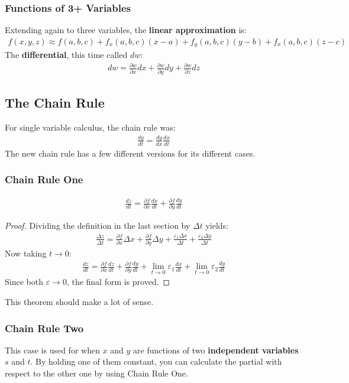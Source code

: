 \documentclass{article}
\newcommand{\p}{\partial}
\begin{document}
\subsubsection{Functions of 3+ Variables}
Extending again to three variables, the \textbf{linear approximation} is:
\begin{gather*}
    f(x,y,z) \approx f(a,b,c) + f_x(a,b,c)(x-a) + f_y(a,b,c)(y-b) + f_x(a,b,c)(z-c)
\end{gather*}
The \textbf{differential}, this time called $dw$:
\begin{gather*}
    dw = \frac{\p w}{\p x}dx + \frac{\p w}{\p y}dy + \frac{\p w}{\p z}dz
\end{gather*}
\subsection{The Chain Rule}
For single variable calculus, the chain rule was:
\begin{gather*}
    \frac{dy}{dt} = \frac{dy}{dx}\frac{dx}{dt}
\end{gather*}
The new chain rule has a few different versions for its different cases.
\subsubsection{Chain Rule One}
\begin{gather*}
    \frac{dz}{dt} = \frac{\p f}{\p x}\frac{dx}{dt} + \frac{\p f}{\p y}\frac{dy}{dt}
\end{gather*}
\begin{proof}
Dividing the definition in the last section by $\Delta t$ yields:
\begin{gather*}
    \frac{\Delta z}{\Delta t} = \frac{\p f}{\p x}\Delta x + \frac{\p f}{\p y} \Delta y + \frac{\varepsilon_1 \Delta x}{\Delta t} + \frac{\varepsilon_2 \Delta y}{\Delta t}
\end{gather*}
Now taking $t \to 0$:
\begin{gather*}
    \frac{dz}{dt} = \frac{\p f}{\p x}\frac{dz}{dt} + \frac{\p f}{\p y} \frac{dy}{dt} + \lim_{t \to 0} \varepsilon_1 \frac{dx}{dt} + \lim_{t \to 0} \varepsilon_2 \frac{dy}{dt}
\end{gather*}
Since both $\varepsilon \to 0$, the final form is proved.
\end{proof}
This theorem should make a lot of sense.
\subsubsection{Chain Rule Two}
This case is used for when $x$ and $y$ are functions of two \textbf{independent variables} $s$ and $t$. By holding one of them constant, you can calculate the partial with respect to the other one by using Chain Rule One.
\end{document}
